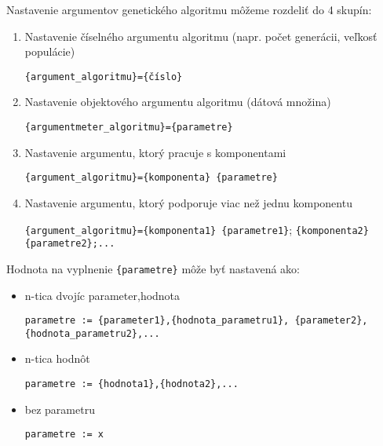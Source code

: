 Nastavenie argumentov genetického algoritmu môžeme rozdeliť do  4 skupín:
\begin{enumerate}
\item Nastavenie číselného argumentu algoritmu (napr. počet generácii, veľkosť populácie)
\begin{center}
\texttt{\{argument\_algoritmu\}=\{číslo\}}
\end{center} 
\item Nastavenie objektového argumentu algoritmu (dátová množina)
\begin{center}
\texttt{\{argumentmeter\_algoritmu\}=\{parametre\}}
\end{center} 
\item Nastavenie argumentu, ktorý pracuje s komponentami
\begin{center}
\texttt{\{argument\_algoritmu\}=\{komponenta\} \{parametre\}}
\end{center}
\item Nastavenie argumentu, ktorý podporuje viac než jednu komponentu
\begin{center}
\texttt{\{argument\_algoritmu\}=\{komponenta1\} \{parametre1\}};
\texttt{\{komponenta2\} \{parametre2\};...}
\end{center}
\end{enumerate}

Hodnota na vyplnenie \texttt{\{parametre\}} môže byť nastavená ako:
\begin{itemize}
\item n-tica dvojíc parameter,hodnota
\begin{center}
\texttt{parametre := \{parameter1\},\{hodnota\_parametru1\},
\{parameter2\},\{hodnota\_parametru2\},...} 
\end{center}
\item n-tica hodnôt
\begin{center}
\texttt{parametre := \{hodnota1\},\{hodnota2\},...} 
\end{center}
\item bez parametru
\begin{center}
\texttt{parametre := x} 
\end{center}
\end{itemize}

